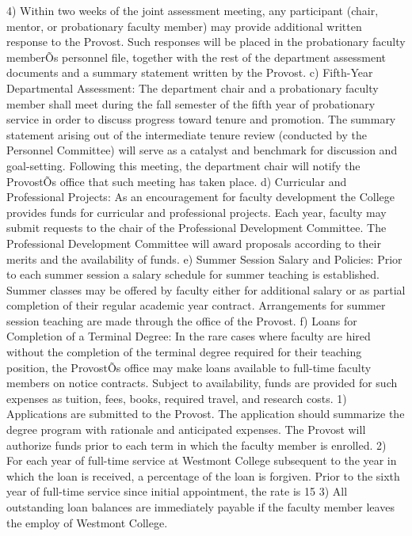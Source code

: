 \documentclass[letterpaper, 11pt]{article}
\begin{document}
			4) Within two weeks of the joint assessment meeting, any participant (chair, mentor, or probationary faculty member) may provide additional written response to the Provost.  Such responses will be placed in the probationary faculty memberÕs personnel file, together with the rest of the department assessment documents and a summary statement written by the Provost.
			c) Fifth-Year Departmental Assessment:  The department chair and a probationary faculty member shall meet during the fall semester of the fifth year of probationary service in order to discuss progress toward tenure and promotion.  The summary statement arising out of the intermediate tenure review (conducted by the Personnel Committee) will serve as a catalyst and benchmark for discussion and goal-setting.  Following this meeting, the department chair will notify the ProvostÕs office that such meeting has taken place.
			d) Curricular and Professional Projects:  As an encouragement for faculty development the College provides funds for curricular and professional projects.  Each year, faculty may submit requests to the chair of the Professional Development Committee. The Professional Development Committee will award proposals according to their merits and the availability of funds.
			e) Summer Session Salary and Policies:  Prior to each summer session a salary schedule for summer teaching is established.  Summer classes may be offered by faculty either for additional salary or as partial completion of their regular academic year contract. Arrangements for summer session teaching are made through the office of the Provost.
			f) Loans for Completion of a Terminal Degree:  In the rare cases where faculty are hired without the completion of the terminal degree required for their teaching position, the ProvostÕs office may make loans available to full-time faculty members on notice contracts. Subject to availability, funds are provided for such expenses as tuition, fees, books, required travel, and research costs.
			1) Applications are submitted to the Provost.  The application should summarize the degree program with rationale and anticipated expenses.  The Provost will authorize funds prior to each term in which the faculty member is enrolled.
			2) For each year of full-time service at Westmont College subsequent to the year in which the loan is received, a percentage of the loan is forgiven.  Prior to the sixth year of full-time service since initial appointment, the rate is 15%
			3) All outstanding loan balances are immediately payable if the faculty member leaves the employ of Westmont College.
\end{document}
